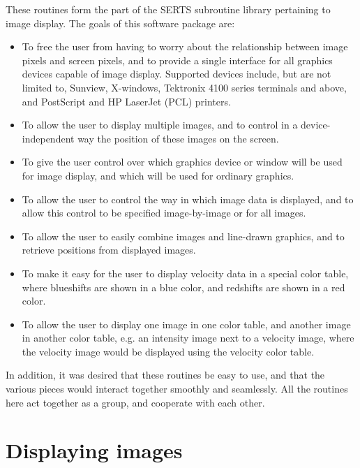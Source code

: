 These routines form the part of the SERTS subroutine library pertaining to
image display.  The goals of this software package are:
\begin{itemize}
\item
To free the user from having to worry about the relationship between image
pixels and screen pixels, and to provide a single interface for all graphics
devices capable of image display.  Supported devices include, but are not
limited to, Sunview, X-windows, Tektronix 4100 series terminals and above, and
PostScript and HP LaserJet (PCL) printers.
\item
To allow the user to display multiple images, and to control in a
device-independent way the position of these images on the screen.
\item
To give the user control over which graphics device or window will be used for
image display, and which will be used for ordinary graphics.
\item
To allow the user to control the way in which image data is displayed, and to
allow this control to be specified image-by-image or for all images.
\item
To allow the user to easily combine images and line-drawn graphics, and to
retrieve positions from displayed images.
\item
To make it easy for the user to display velocity data in a special color table,
where blueshifts are shown in a blue color, and redshifts are shown in a red
color.
\item
To allow the user to display one image in one color table, and another image in
another color table, e.g. an intensity image next to a velocity image, where
the velocity image would be displayed using the velocity color table.
\end{itemize}
In addition, it was desired that these routines be easy to use, and that the
various pieces would interact together smoothly and seamlessly.  All the
routines here act together as a group, and cooperate with each other.

\section{Displaying images}

